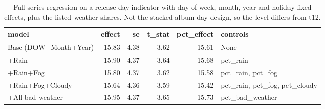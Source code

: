 \begin{table}
\caption{Full-series regression on a release-day indicator with day-of-week, month, year and holiday fixed effects, plus the listed weather shares. Not the stacked album-day design, so the level differs from t12.}
\begin{tabular}{lrrrrl}
\toprule
model & effect & se & t\_stat & pct\_effect & controls \\
\midrule
Base (DOW+Month+Year) & 15.83 & 4.38 & 3.62 & 15.61 & None \\
+Rain & 15.90 & 4.37 & 3.64 & 15.68 & pct\_rain \\
+Rain+Fog & 15.80 & 4.37 & 3.62 & 15.58 & pct\_rain, pct\_fog \\
+Rain+Fog+Cloudy & 15.64 & 4.36 & 3.59 & 15.42 & pct\_rain, pct\_fog, pct\_cloudy \\
+All bad weather & 15.95 & 4.37 & 3.65 & 15.73 & pct\_bad\_weather \\
\bottomrule
\end{tabular}
\end{table}
